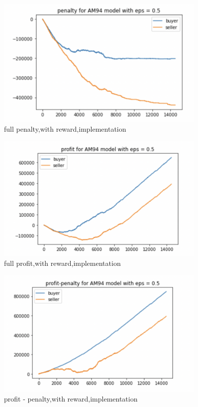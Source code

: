 \documentclass[11pt]{article}
\begin{document}
\begin{figure}[H]
	\begin{center}
	\includegraphics[width=0.9\textwidth]{4.PNG}
	\end{center}
	\caption{full penalty,with reward,implementation}
	\label{FIG.4}
\end{figure}

\begin{figure}[H]
	\begin{center}
	\includegraphics[width=0.9\textwidth]{5.PNG}
	\end{center}
	\caption{full profit,with reward,implementation}
	\label{FIG.5}
\end{figure}

\begin{figure}[H]
	\begin{center}
	\includegraphics[width=0.9\textwidth]{6.PNG}
	\end{center}
	\caption{profit - penalty,with reward,implementation}
	\label{FIG.6}
\end{figure}
\end{document}
